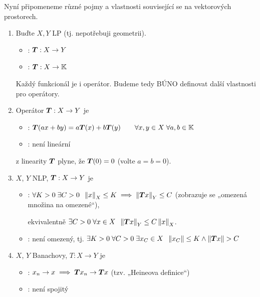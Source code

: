 \phantom{.}

Nyní připomeneme různé pojmy a vlastnosti související se  na vektorových prostorech.
\begin{enumerate}
    \item Buďte $X,Y$ LP (tj. nepotřebuji geometrii).
    \begin{itemize}
        \item {}: $\boldsymbol{T}: X \to Y$
        \item {}: $\boldsymbol{T}: X \to \mathbb{K}$
    \end{itemize}
    Každý funkcionál je i operátor. Budeme tedy BÚNO definovat další vlastnosti pro operátory.
    
    \item Operátor $\boldsymbol{T}: X \to Y$ je
    \begin{itemize}
        \item {}: $\boldsymbol{T}(ax + by) = a \boldsymbol{T}(x) + b \boldsymbol{T}(y) \hspace{2em} \forall x,y \in X \; \forall a,b \in \mathbb{K}$
        \item {}: není lineární
    \end{itemize}
    
    \Poznamka z linearity $\boldsymbol{T}$ plyne, že $\boldsymbol{T}(0) = 0$ (volte $a=b=0$).
    
    \item $X$, $Y$ NLP, $\boldsymbol{T}: X \to Y$ je
    \begin{itemize}
        \item {}: $\forall K>0 \; \exists C>0 \;\; \left\lVert x\right\rVert_X \leq K \implies \left\lVert\boldsymbol{T}x\right\rVert_Y \leq C$ (zobrazuje se „omezená množina na omezené“),
        
        ekvivalentně $\exists C>0 \; \forall x \in X \;\; \left\lVert\boldsymbol{T}x\right\rVert_Y \leq C \left\lVert x\right\rVert_X $.
        
        \item {}: není omezený, tj. $\exists K>0 \; \forall C>0 \; \exists x_C \in X \;\; \left\lVert x_C\right\rVert \leq K \wedge \left\lVert\boldsymbol{T}x\right\rVert > C$
    \end{itemize}
    
    \item $X$, $Y$ Banachovy, $T: X \to Y$ je
    \begin{itemize}
        \item {}: $x_n \to x \implies \boldsymbol{T} x_n \to \boldsymbol{T} x$ (tzv. „Heineova definice“)
        
        \item {}: není spojitý
    \end{itemize}
\end{enumerate}

